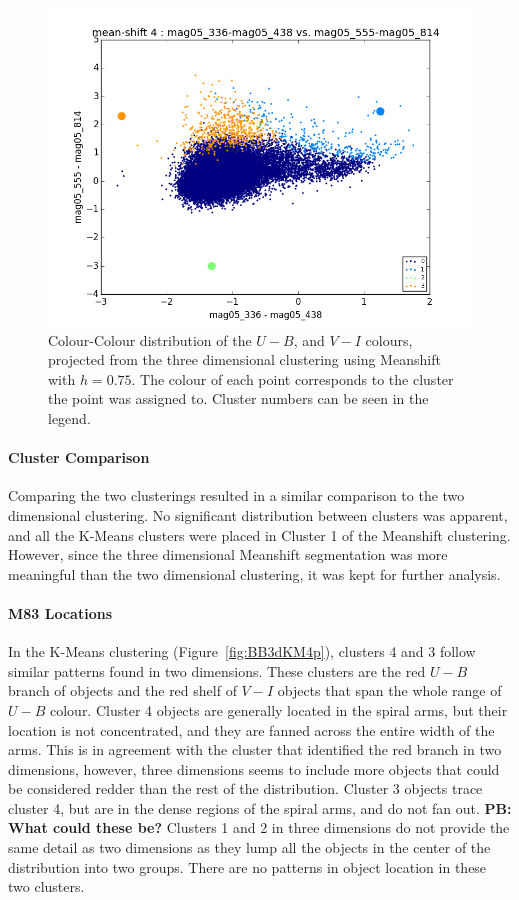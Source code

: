 \begin{figure}[H]
\centering
\includegraphics[width=\linewidth]{figs/meanshift_base_color_4cl_mag05_336-mag05_438vsmag05_555-mag05_814}
\caption{Colour-Colour distribution of the $U - B$, and $V - I$ colours, projected from the three dimensional clustering using Meanshift with $h=0.75$. The colour of each point corresponds to the cluster the point was assigned to. Cluster numbers can be seen in the legend.}
\label{fig:BB3dMS4p}
\end{figure}

\paragraph{Cluster Comparison}
Comparing the two clusterings resulted in a similar comparison to the two dimensional clustering.
No significant distribution between clusters was apparent, and all the K-Means clusters were placed in Cluster 1 of the Meanshift clustering.
However, since the three dimensional Meanshift segmentation was more meaningful than the two dimensional clustering, it was kept for further analysis.

\paragraph{M83 Locations}

In the K-Means clustering (Figure~\ref{fig:BB3dKM4p}), clusters 4 and 3 follow similar patterns found in two dimensions.
These clusters are the red $U - B$ branch of objects and the red shelf of $V - I$ objects that span the whole range of $U - B$ colour.
Cluster 4 objects are generally located in the spiral arms, but their location is not concentrated, and they are fanned across the entire width of the arms.
This is in agreement with the cluster that identified the red branch in two dimensions, however, three dimensions seems to include more objects that could be considered redder than the rest of the distribution.
Cluster 3 objects trace cluster 4, but are in the dense regions of the spiral arms, and do not fan out. \textbf{PB: What could these be?}
Clusters 1 and 2 in three dimensions do not provide the same detail as two dimensions as they lump all the objects in the center of the distribution into two groups.
There are no patterns in object location in these two clusters.

